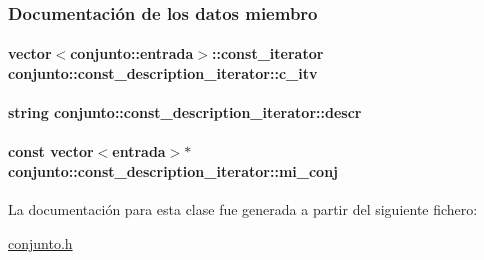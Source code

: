 \subsubsection{Documentación de los datos miembro}
\hypertarget{classconjunto_1_1const__description__iterator_a41cc62c64850c507f4d6bbed318d8949}{
\paragraph[{c\-\_\-itv}]{\setlength{\rightskip}{0pt plus 5cm}vector$<${\bf conjunto\-::entrada}$>$\-::{\bf const\-\_\-iterator} conjunto\-::const\-\_\-description\-\_\-iterator\-::c\-\_\-itv\hspace{0.3cm}{\ttfamily [private]}}}\label{classconjunto_1_1const__description__iterator_a41cc62c64850c507f4d6bbed318d8949}
\hypertarget{classconjunto_1_1const__description__iterator_a46a1e768efcf3886d1ab9063b76dcbe7}{
\paragraph[{descr}]{\setlength{\rightskip}{0pt plus 5cm}string conjunto\-::const\-\_\-description\-\_\-iterator\-::descr\hspace{0.3cm}{\ttfamily [private]}}}\label{classconjunto_1_1const__description__iterator_a46a1e768efcf3886d1ab9063b76dcbe7}
\hypertarget{classconjunto_1_1const__description__iterator_a9d24dd6c5eb3171c4543d164d5d152e6}{
\paragraph[{mi\-\_\-conj}]{\setlength{\rightskip}{0pt plus 5cm}const vector$<${\bf entrada}$>$$\ast$ conjunto\-::const\-\_\-description\-\_\-iterator\-::mi\-\_\-conj\hspace{0.3cm}{\ttfamily [private]}}}\label{classconjunto_1_1const__description__iterator_a9d24dd6c5eb3171c4543d164d5d152e6}


La documentación para esta clase fue generada a partir del siguiente fichero\-:\begin{DoxyCompactItemize}
\item 
\hyperlink{conjunto_8h}{conjunto.\-h}\end{DoxyCompactItemize}
